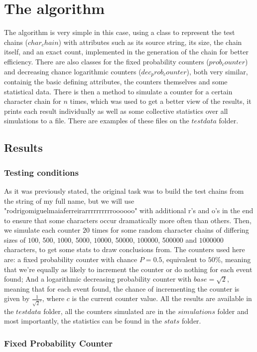 \documentclass[...]{revdetua}
\begin{document}
\section{The algorithm}
The algorithm is very simple in this case, using a class to represent the test chains ($char_chain$) with attributes such as its source string, its size, the chain itself, and an exact count, implemented in the generation of the chain for better efficiency. There are also classes for the fixed probability counters ($prob_counter$) and decreasing chance logarithmic counters ($dec_prob_counter$), both very similar, containig the basic defining attributes, the counters themselves and some statistical data.
There is then a method to simulate a counter for a certain character chain for $n$ times, which was used to get a better view of the results, it prints each result individually as well as some collective statistics over all simulations to a file. There are examples of these files on the $testdata$ folder.

\subsection{Results}
\subsubsection{Testing conditions}
As it was previously stated, the original task was  to build the test chains from the string of my full name, but we will use "rodrigomiguelmaiaferreirarrrrrrrrrroooooo" with additional r's and o's in the end to ensure that some characters occur dramatically more often than others.
Then, we simulate each counter $20$ times for some random character chains of differing sizes of $100$, 500, $1000$, 5000, $10000$, 50000, $100000$, 500000 and $1000000$ characters, to get some stats to draw conclusions from.
The counters used here are: a fixed probability counter with chance $P=0.5$, equivalent to $50$\%, meaning that we're equally as likely to increment the counter or do nothing for each event found; And a logarithmic decreasing probability counter with $base=\sqrt{2}$, meaning that for each event found, the chance of incrementing the counter is given by $\frac{1}{\sqrt{2}^{c}}$, where $c$ is the current counter value.
All the results are available in the $testdata$ folder, all the counters simulated are in the $simulations$ folder and most importantly, the statistics can be found in the $stats$ folder.

\subsubsection{Fixed Probability Counter}
\end{document}

